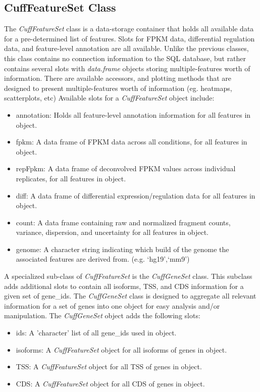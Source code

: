 \documentclass[10pt]{article}
\newcommand{\Rclass}[1]{{\textit{#1}}}
\begin{document}
\subsection{CuffFeatureSet Class}
	The \Rclass{CuffFeatureSet} class is a data-storage container that holds all available data for a pre-determined list of features. Slots for FPKM data, differential regulation data, and feature-level annotation are all available. Unlike the previous classes, this class contains no connection information to the SQL database, but
	rather contains several slots with \Rclass{data.frame} objects storing multiple-features worth of information.  There are available accessors, and plotting methods that are designed to present multiple-features worth of information (eg. heatmaps, scatterplots, etc)
	Available slots for a \Rclass{CuffFeatureSet} object include:
	\begin{itemize}
		\item annotation: Holds all feature-level annotation information for all features in object.
		\item fpkm: A data frame of FPKM data across all conditions, for all features in object.
		\item repFpkm: A data frame of deconvolved FPKM values across individual replicates, for all features in object.
		\item diff: A data frame of differential expression/regulation data for all features in object.
		\item count: A data frame containing raw and normalized fragment counts, variance, dispersion, and uncertainty for all features in object.
        \item genome: A character string indicating which build of the genome
        the associated features are derived from.  (e.g. `hg19',`mm9')
	\end{itemize}
	
	A specialized sub-class of \Rclass{CuffFeatureSet} is the \Rclass{CuffGeneSet} class. This subclass adds additional slots to contain all isoforms, TSS, and CDS information for a given set of gene\_ids.  The \Rclass{CuffGeneSet} class is designed to aggregate all relevant
	information for a set of genes into one object for easy analysis and/or manipulation.
	The \Rclass{CuffGeneSet} object adds the following slots:
	\begin{itemize}
		\item ids: A 'character' list of all gene\_ids used in object.
		\item isoforms: A \Rclass{CuffFeatureSet} object for all isoforms of genes in object.
		\item TSS: A \Rclass{CuffFeatureSet} object for all TSS of genes in object.
		\item CDS: A \Rclass{CuffFeatureSet} object for all CDS of genes in object.
	\end{itemize}
\end{document}
